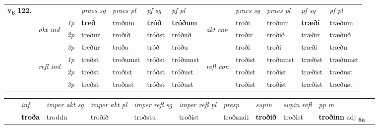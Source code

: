 \begin{tabular}{llllllllllll} \toprule
\multirow{4}{*}{{{\textbf{v{\textsubscript{6}}} \Large{\textbf{122.}}}}}  & &   &  \textit{praes sg}  & \textit{praes pl}  &\textit{ pf sg} & \textit{pf pl} &  &  \textit{praes sg}  & \textit{praes pl}  & \textit{pf sg} & \textit{pf pl } \\*
	\cmidrule{4-7} \cmidrule{9-12}
 & \multirow{3}{*}{\begin{turn}{90}\textit{akt ind}\end{turn}} & {\textit{1p}} & \textbf{treð} & troðum    & \textbf{tróð} & \textbf{tróðum} & \multirow{3}{*}{\begin{turn}{90}\textit{akt con}\end{turn}} &troði & troðum & \textbf{træði} & træðum\\*
& &  {\textit{2p}} &  treður  & troðið   & tróðst & tróðuð & & troðir & troðið & træðir & træðuð \\*
& &  {\textit{3p}} & treður & troða   & tróð & tróðu & & troði & troði& træði & træðu  \\*
\cmidrule{4-7} \cmidrule{9-12}
 &\multirow{3}{*}{\begin{turn}{90}\textit{refl ind}\end{turn}} & {\textit{1p}} & treðst & troðumst    & tróðst & tróðumst & \multirow{3}{*}{\begin{turn}{90}\textit{refl con}\end{turn}}  &troðist & troðumst & træðist & træðumst\\*
 &&  {\textit{2p}} &  treðst  & troðist   & tróðst & tróðust & &troðist & troðist & træðist & træðust \\*
& &  {\textit{3p}} & treðst & troðast   & tróðst & tróðust & & troðist & troðist& træðist & træðust  \\*
\cmidrule{4-7} \cmidrule{9-12}
\end{tabular}


\begin{tabular}{llllllllllll}
 & & \textit{inf} & \textit{imper akt sg} & \textit{imper akt pl} & \textit{imper refl sg} & \textit{imper refl pl} & \textit{presp} & \textit{supin} & \textit{supin refl} & \textit{pp m}     \\*
  & & \textbf{troða} & troddu  & troðið & troðstu & troðist & troðandi &  \textbf{troðið} & troðist & \textbf{troðinn} adj \textbf{\textsubscript{6a}} \\*
\cmidrule{1-12}
\end{tabular}



